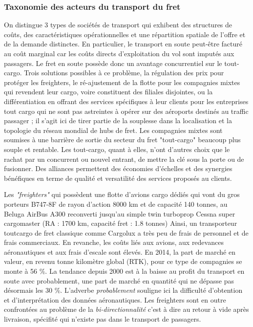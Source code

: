 \subsubsection{Taxonomie des acteurs du transport du fret}

On distingue 3 types de sociétés de transport qui exhibent des structures de coûts, des ca\-racté\-risti\-ques opérationnelles et une répartition spatiale de l'offre et de la demande distinctes. En particulier, le transport en soute peut-être facturé au coût marginal car les coûts directs d'exploitation du vol sont imputés aux passagers. Le fret en soute possède donc un avantage concurrentiel sur le tout-cargo. Trois solutions possibles à ce problème, la régulation des prix pour protéger les freighters, le ré-ajustement de la flotte pour les compagnies mixtes qui revendent leur cargo, voire constituent des filiales disjointes, ou la différentiation en offrant des services spécifiques à leur clients pour les entreprises tout cargo qui ne sont pas astreintes à opérer sur des aéroports destinés au traffic passager ; il s'agit ici de tirer partie
de la souplesse dans la localisation et la topologie du réseau mondial de hubs de fret.
Les compagnies mixtes sont soumises à une barrière de sortie du secteur du fret "tout-cargo" beaucoup plus souple et rentable. Les tout-cargo, quant à elles, n'ont d'autres choix que le rachat par un concurrent ou nouvel entrant, de mettre la clé sous la porte ou de fusionner. Des alliances permettent des économies d'échelles et des synergies bénéfiques en terme de qualité et versatilité des services proposés au clients.



Les \textit {"freighters"} qui possèdent une flotte d'avions cargo dédiés qui vont du gros porteurs B747-8F de rayon d'action 8000 km et de capacité 140 tonnes, au Beluga AirBus A300 reconverti jusqu'au simple twin turboprop Cessna super cargomaster (RA : 1700 km, capacité fret : 1.8 tonnes) Ainsi, un transporteur tout\-cargo de fret classique comme Cargolux a très peu de frais de personnel et de frais commerciaux. En revanche, les coûts liés aux avions, aux redevances aéronautiques et aux frais d’escale sont élevés. En 2014, la part de marché en valeur, en revenu tonne kilomètre global (RTK), pour ce type de compagnies se monte à 56 \%. La tendance depuis 2000 est à la baisse au profit du transport en soute avec probablement, une part de marché en quantité qui ne dépasse pas désormais les 30 \%. L'adverbe \textit{probablement} souligne ici la difficulté d'obtention et d'interprétation des données aéronautiques. Les freighters sont en outre confrontées au problème de la \textit{bi-directionnalité} c'est à dire au retour à vide après livraison, spécifité qui n'existe pas dans le transport de passagers. 
	

